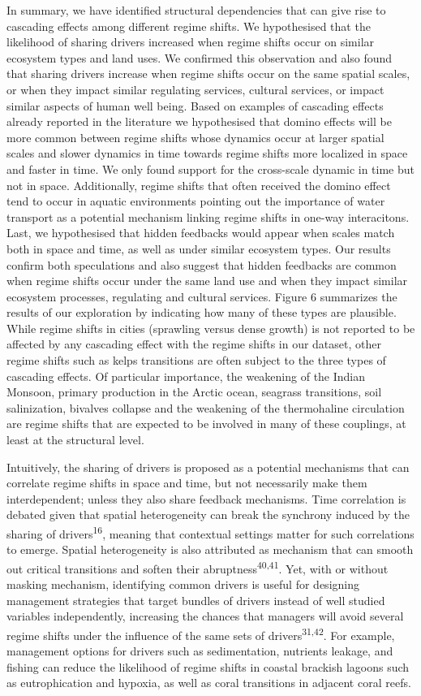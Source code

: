 \documentclass[9pt,]{article}
\begin{document}
In summary, we have identified structural dependencies that can give
rise to cascading effects among different regime shifts. We hypothesised
that the likelihood of sharing drivers increased when regime shifts
occur on similar ecosystem types and land uses. We confirmed this
observation and also found that sharing drivers increase when regime
shifts occur on the same spatial scales, or when they impact similar
regulating services, cultural services, or impact similar aspects of
human well being. Based on examples of cascading effects already
reported in the literature we hypothesised that domino effects will be
more common between regime shifts whose dynamics occur at larger spatial
scales and slower dynamics in time towards regime shifts more localized
in space and faster in time. We only found support for the cross-scale
dynamic in time but not in space. Additionally, regime shifts that often
received the domino effect tend to occur in aquatic environments
pointing out the importance of water transport as a potential mechanism
linking regime shifts in one-way interacitons. Last, we hypothesised
that hidden feedbacks would appear when scales match both in space and
time, as well as under similar ecosystem types. Our results confirm both
speculations and also suggest that hidden feedbacks are common when
regime shifts occur under the same land use and when they impact similar
ecosystem processes, regulating and cultural services. Figure 6
summarizes the results of our exploration by indicating how many of
these types are plausible. While regime shifts in cities (sprawling
versus dense growth) is not reported to be affected by any cascading
effect with the regime shifts in our dataset, other regime shifts such
as kelps transitions are often subject to the three types of cascading
effects. Of particular importance, the weakening of the Indian Monsoon,
primary production in the Arctic ocean, seagrass transitions, soil
salinization, bivalves collapse and the weakening of the thermohaline
circulation are regime shifts that are expected to be involved in many
of these couplings, at least at the structural level.

Intuitively, the sharing of drivers is proposed as a potential
mechanisms that can correlate regime shifts in space and time, but not
necessarily make them interdependent; unless they also share feedback
mechanisms. Time correlation is debated given that spatial heterogeneity
can break the synchrony induced by the sharing of
drivers\textsuperscript{16}, meaning that contextual settings matter for
such correlations to emerge. Spatial heterogeneity is also attributed as
mechanism that can smooth out critical transitions and soften their
abruptness\textsuperscript{40,41}. Yet, with or without masking
mechanism, identifying common drivers is useful for designing management
strategies that target bundles of drivers instead of well studied
variables independently, increasing the chances that managers will avoid
several regime shifts under the influence of the same sets of
drivers\textsuperscript{31,42}. For example, management options for
drivers such as sedimentation, nutrients leakage, and fishing can reduce
the likelihood of regime shifts in coastal brackish lagoons such as
eutrophication and hypoxia, as well as coral transitions in adjacent
coral reefs.
\end{document}
